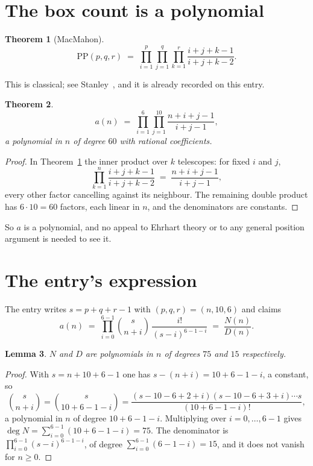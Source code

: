 \documentclass[11pt,a4paper]{article}
\theoremstyle{plain}
\newtheorem{theorem}{Theorem}
\newtheorem{lemma}[theorem]{Lemma}
\theoremstyle{definition}
\begin{document}
\section{The box count is a polynomial}

\begin{theorem}[MacMahon]\label{thm:mm}
\[
\mathrm{PP}(p,q,r)\;=\;\prod_{i=1}^{p}\prod_{j=1}^{q}\prod_{k=1}^{r}
\frac{i+j+k-1}{i+j+k-2} .
\]
\end{theorem}

This is classical; see Stanley~\cite{stanley}, and it is already recorded on this entry.

\begin{theorem}\label{thm:poly}
\[
a(n)\;=\;\prod_{i=1}^{6}\prod_{j=1}^{10}\frac{n+i+j-1}{i+j-1},
\]
a polynomial in $n$ of degree $60$ with rational coefficients.
\end{theorem}

\begin{proof}
In Theorem~\ref{thm:mm} the inner product over $k$ telescopes: for fixed $i$ and $j$,
\[
\prod_{k=1}^{n}\frac{i+j+k-1}{i+j+k-2}\;=\;\frac{n+i+j-1}{i+j-1} ,
\]
every other factor cancelling against its neighbour. The remaining double product has
$6\cdot10=60$ factors, each linear in $n$, and the denominators are constants.
\end{proof}

So $a$ is a polynomial, and no appeal to Ehrhart theory or to any general position argument is
needed to see it.

\section{The entry's expression}

The entry writes $s=p+q+r-1$ with $(p,q,r)=(n,10,6)$ and claims
\[
a(n)\;=\;\prod_{i=0}^{6-1}\binom{s}{n+i}\,\frac{i!}{(s-i)^{6-1-i}}\;=\;
\frac{N(n)}{D(n)} .
\]

\begin{lemma}\label{lem:deg}
$N$ and $D$ are polynomials in $n$ of degrees $75$ and $15$ respectively.
\end{lemma}

\begin{proof}
With $s=n+10+6-1$ one has $s-(n+i)=10+6-1-i$, a constant, so
\[
\binom{s}{n+i}=\binom{s}{10+6-1-i}
=\frac{(s-10-6+2+i)(s-10-6+3+i)\cdots s}{(10+6-1-i)!},
\]
a polynomial in $n$ of degree $10+6-1-i$. Multiplying over $i=0,\dots,6-1$ gives
$\deg N=\sum_{i=0}^{6-1}(10+6-1-i)=75$. The denominator is
$\prod_{i=0}^{6-1}(s-i)^{6-1-i}$, of degree
$\sum_{i=0}^{6-1}(6-1-i)=15$, and it does not vanish for $n\ge0$.
\end{proof}
\end{document}
